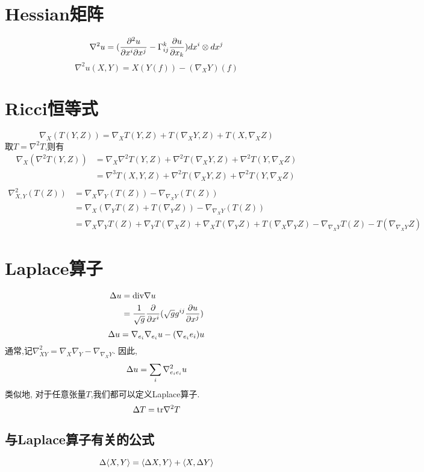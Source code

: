 \section{Hessian矩阵}
\begin{equation}
    \nabla^2u=(\frac{\P^2u}{\P x^i\P x^j}-\Gamma^k_{ij}\frac{\P u}{\P x_k})dx^i\otimes dx^j
\end{equation}
\begin{equation}
    \nabla^2u(X,Y)=X(Y(f))-(\nabla_XY)(f)
\end{equation}
\section{Ricci恒等式}
\begin{equation}
    \nabla_X(T(Y,Z))=\nabla_XT(Y,Z)+T(\nabla_XY,Z)+T(X,\nabla_XZ)
\end{equation}
取$T=\nabla^2T$,则有
\begin{equation}
    \begin{split}
        \nabla_X(\nabla^2T(Y,Z))&=\nabla_X\nabla^2T(Y,Z)+\nabla^2T(\nabla_XY,Z)+\nabla^2T(Y,\nabla_XZ)\\
        &=\nabla^3T(X,Y,Z)+\nabla^2T(\nabla_XY,Z)+\nabla^2T(Y,\nabla_XZ)\\
    \end{split}
\end{equation}
\begin{equation}
    \begin{split}
        \nabla^2_{X,Y}(T(Z))&=\nabla_X\nabla_Y(T(Z)) -\nabla_{\nabla_XY}(T(Z))\\
        &=\nabla_X(\nabla_YT(Z)+T(\nabla_YZ)) -\nabla_{\nabla_XY}(T(Z))\\
        &=\nabla_X\nabla_YT(Z)+\nabla_YT(\nabla_XZ)+\nabla_XT(\nabla_YZ)+T(\nabla_X\nabla_YZ)-\nabla_{\nabla_XY}T(Z)-T(\nabla_{\nabla_XY}Z)
    \end{split}
\end{equation}
\section{Laplace算子}
\begin{equation}
    \begin{split}
        \Laplace u &=\div \nabla u \\
        &=\rec{\sqrt{g}}\frac{\P}{\P x^i}(\sqrt{g}g^{ij}\frac{\P u}{\P x^j}) 
    \end{split}
\end{equation}
\begin{equation}
    \Laplace u=\nabla_{e_i}\nabla_{e_i}u-(\nabla_{e_i}e_i)u
\end{equation}
通常,记$\nabla^2_{XY}=\nabla_X\nabla_Y-\nabla_{\nabla_XY}$. 因此,
\begin{equation}
    \Laplace u=\sum_i\nabla^2_{e_ie_i}u
\end{equation}
类似地, 对于任意张量$T$,我们都可以定义Laplace算子.
\begin{equation}
    \Laplace T=\tr \nabla^2 T
\end{equation}
\subsection{与Laplace算子有关的公式}
\begin{equation}
    \Laplace\inner{X}{Y}=\inner{\Laplace X}{Y}+\inner{X}{\Laplace Y}
\end{equation}